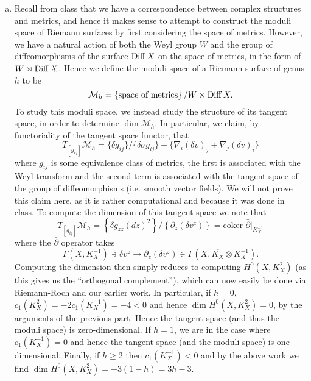 \documentclass{../mathnotes}
\begin{document}
\begin{enumerate}[(a)]

    \item Recall from class that we have a correspondence between complex structures and metrics, and hence it makes sense to attempt to construct
        the moduli space of Riemann surfaces by first considering the space of metrics. However, we have a natural action of both the Weyl group $W$ and
        the group of diffeomorphisms of the surface $\operatorname{Diff} X$ on the space of metrics, in the form of $W\rtimes\operatorname{Diff} X$. Hence we define the moduli space
        of a Riemann surface of genus $h$ to be
        \[\mathcal{M}_h=\left\{ \text{space of metrics} \right\}/W\rtimes\operatorname{Diff} X.\]
        To study this moduli space, we instead study the structure of its tangent space, in order to determine $\dim\mathcal{M}_h$. In particular,
        we claim, by functoriality of the tangent space functor, that
        \[T_{[g_{ij}]}\mathcal{M}_h=\{\delta g_{ij}\}/\{\delta\sigma g_{ij}\}+\{\nabla_i(\delta v)_j+\nabla_j(\delta v)_i\}\]
        where $g_{ij}$ is some equivalence class of metrics, the first is associated with the Weyl transform and the second term is associated
        with the tangent space of the group of diffeomorphisms (i.e. smooth vector fields).
        We will not prove this claim here, as it is
        rather computational and because it was done in class. To compute the dimension of this tangent space we note that
        \[T_{[g_{ij}]}\mathcal{M}_h=\left\{ \delta g_{\bar z\bar z}(d\bar z)^2 \right\}/\left\{ \partial_{\bar z}(\delta v^z) \right\}=\text{coker }\bar\partial|_{K_X^{-1}}\]
        where the $\bar\partial$ operator takes
        \[\Gamma(X,K_X^{-1})\ni\delta v^z\longrightarrow\partial_{\bar z}(\delta v^z)\in\Gamma(X,\overline{K_{X}}\otimes K_X^{-1}).\]
        Computing the dimension then simply reduces to computing $H^0(X,K_X^2)$ (as this gives us the ``orthogonal complement''), which can now easily
        be done via Riemann-Roch and our earlier work. In particular, if $h=0$, $c_1(K_X^2)=-2c_1(K_X^{-1})=-4<0$ and hence $\dim H^0(X,K_X^2)=0$,
        by the arguments of the previous part. Hence the tangent space (and thus the moduli space) is zero-dimensional.
        If $h=1$, we are in the case where $c_1(K_X^{-1})=0$ and hence the tangent space (and the moduli space) is one-dimensional.
        Finally, if $h\geq 2$ then $c_1(K_X^{-1})<0$ and by the above work we find $\dim H^0(X,K_X^2)=-3(1-h)=3h-3$.
\end{enumerate}
\end{document}
